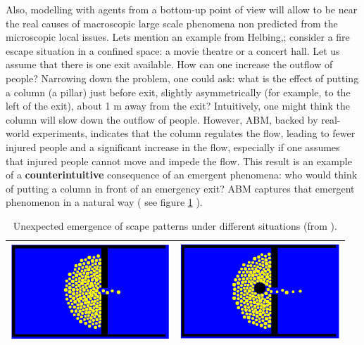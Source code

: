 \documentclass[11pt,oneside,a4paper,openright]{report}
\begin{document}
Also, modelling with agents from a bottom-up point of view will allow to be near the real causes of macroscopic large scale phenomena non predicted from the microscopic local issues. 
Lets mention an example from Helbing,\cite{Helbing2000}; consider a fire escape situation in a confined space: a movie theatre or a concert hall. Let us assume that there is one exit available. How can one increase the outflow of people? Narrowing down the problem, one could ask: what is the effect of putting a column (a pillar) just before exit, slightly asymmetrically (for example, to the left of the exit), about 1 m away from the exit? Intuitively, one might think the column will slow down the outflow of people. However, ABM, backed by real-world experiments, indicates that the column regulates the flow, leading to fewer injured people and a significant increase in the flow, especially if one assumes that injured people cannot move and impede the flow. This result is an example of a \textbf{counterintuitive} consequence of an emergent phenomena: who would think of putting a column in front of an emergency exit? ABM captures that emergent phenomenon in a natural way ( see figure \ref{tab:columnExit} ).\\
	\begin{table}[ht!]
	\centering
	\begin{tabular}{|c|c|}
		\hline
		\includegraphics[width=60mm,keepaspectratio=true]{figures/column1.png}
		&
		\includegraphics[width=60mm,keepaspectratio=true]{figures/column2.png}\\
		\hline
	\end{tabular}
	\caption{Unexpected emergence of scape patterns under different situations (from \cite{Bonabeau2002}).}
	\label{tab:columnExit}
	\end{table}
\end{document}
